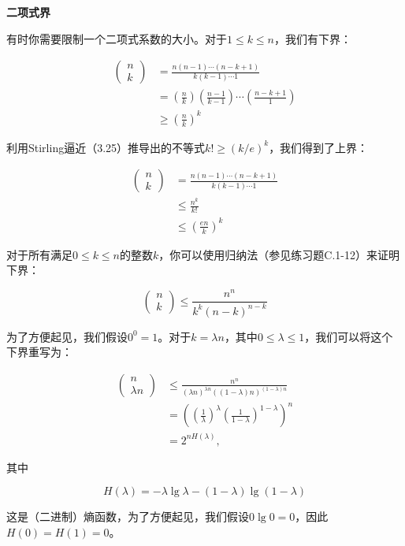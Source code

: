 \documentclass[lang=cn,newtx,10pt,scheme=chinese]{elegantbook}
\begin{document}
\textbf{二项式界}

有时你需要限制一个二项式系数的大小。对于$1 \leq k \leq n$，我们有下界：

$$
\begin{aligned}
(\begin{array}{l}
n \\
k
\end{array}) & =\frac{n(n-1) \cdots(n-k+1)}{k(k-1) \cdots 1} \\
& =(\frac{n}{k})(\frac{n-1}{k-1}) \cdots(\frac{n-k+1}{1}) \\
& \geq(\frac{n}{k})^k
\end{aligned}
$$

利用Stirling逼近（3.25）推导出的不等式$k ! \geq(k / e)^k$，我们得到了上界：

$$
\begin{aligned}
(\begin{array}{l}
n \\
k
\end{array}) & =\frac{n(n-1) \cdots(n-k+1)}{k(k-1) \cdots 1} \\
& \leq \frac{n^k}{k !} \\
& \leq(\frac{e n}{k})^k
\end{aligned}
$$

对于所有满足$0 \leq k \leq n$的整数$k$，你可以使用归纳法（参见练习题C.1-12）来证明下界：

$$
(\begin{array}{l}
n \\
k
\end{array}) \leq \frac{n^n}{k^k(n-k)^{n-k}}
$$

为了方便起见，我们假设$0^0=1$。对于$k=\lambda n$，其中$0 \leq \lambda \leq 1$，我们可以将这个下界重写为：

$$
\begin{aligned}
(\begin{array}{c}
n \\
\lambda n
\end{array}) & \leq \frac{n^n}{(\lambda n)^{\lambda n}((1-\lambda) n)^{(1-\lambda) n}} \\
& =((\frac{1}{\lambda})^\lambda(\frac{1}{1-\lambda})^{1-\lambda})^n \\
& =2^{n H(\lambda)},
\end{aligned}
$$

其中

$$
H(\lambda)=-\lambda \lg \lambda-(1-\lambda) \lg (1-\lambda)
$$

这是（二进制）熵函数，为了方便起见，我们假设$0 \lg 0=0$，因此$H(0)=H(1)=0$。
\end{document}
